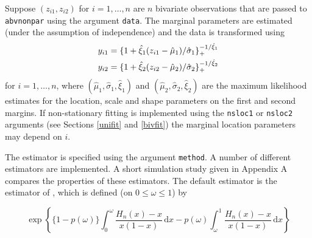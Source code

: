 \documentclass[11pt,a4paper]{article}
\begin{document}
Suppose $(z_{i1},z_{i2})$ for $i=1,\dots,n$ are $n$ bivariate observations that are passed to \verb+abvnonpar+ using the argument \verb+data+.
The marginal parameters are estimated (under the assumption of independence) and the data is transformed using
\begin{align}
y_{i1} &= \{1+\hat{\xi}_1(z_{i1}-\hat{\mu}_1)/\hat{\sigma}_1\}_{+}^{-1/\hat{\xi}_1} \notag \\
y_{i2} &= \{1+\hat{\xi}_2(z_{i2}-\hat{\mu}_2)/\hat{\sigma}_2\}_{+}^{-1/\hat{\xi}_2}
\label{transtoexp}
\end{align} 
for $i=1,\dots,n$, where $(\hat{\mu}_1,\hat{\sigma}_1,\hat{\xi}_1)$ and $(\hat{\mu}_2,\hat{\sigma}_2,\hat{\xi}_2)$ are the maximum likelihood estimates for the location, scale and shape parameters on the first and second margins.
If non-stationary fitting is implemented using the \verb+nsloc1+ or \verb+nsloc2+ arguments (see Sections \ref{unifit} and \ref{bivfit}) the marginal location parameters may depend on $i$.

The estimator is specified using the argument \verb+method+. A number of different estimators are implemented. A short simulation study given in Appendix A compares the properties of these estimators. The default estimator is the estimator of \citet{capefoug97}, which is defined (on $0 \leq \omega \leq 1$) by

\begin{equation*}
\exp\left\{ \{1-p(\omega)\} \int_{0}^{\omega} \frac{H_n(x) - x}{x(1-x)} \, \text{d}x - p(\omega) \int_{\omega}^{1} \frac{H_n(x) - x}{x(1-x)} \, \text{d}x \right\}
\end{equation*}



\end{document}
